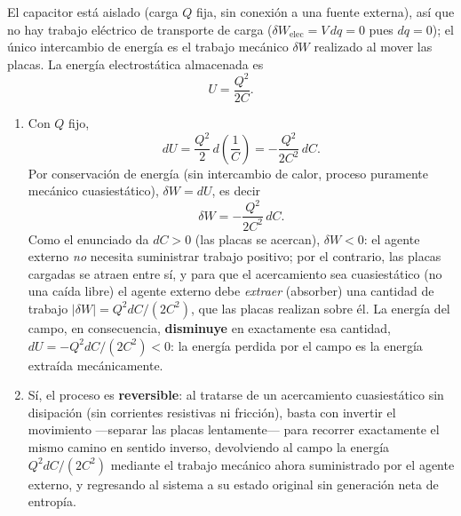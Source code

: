 \documentclass[12pt,a4paper]{article}
\newcommand{\paren}[1]{\left( #1 \right)}
\begin{document}
    \begin{solucion}
        El capacitor está aislado (carga $Q$ fija, sin conexión a una fuente externa), así que
        no hay trabajo eléctrico de transporte de carga ($\delta W_{\text{elec}}=V\,dq=0$ pues
        $dq=0$); el único intercambio de energía es el trabajo mecánico $\delta W$ realizado al
        mover las placas. La energía electrostática almacenada es
        \begin{equation*}
            U=\frac{Q^{2}}{2C}.
        \end{equation*}
        \begin{enumerate}
            \item[a)-b)] Con $Q$ fijo,
            \begin{equation*}
                dU=\frac{Q^{2}}{2}\,d\paren{\frac1C}=-\frac{Q^{2}}{2C^{2}}\,dC.
            \end{equation*}
            Por conservación de energía (sin intercambio de calor, proceso puramente mecánico
            cuasiestático), $\delta W=dU$, es decir
            \begin{equation*}
                \boxed{\delta W=-\frac{Q^{2}}{2C^{2}}\,dC.}
            \end{equation*}
            Como el enunciado da $dC>0$ (las placas se acercan), $\delta W<0$: el agente
            externo \emph{no} necesita suministrar trabajo positivo; por el contrario, las
            placas cargadas se atraen entre sí, y para que el acercamiento sea cuasiestático
            (no una caída libre) el agente externo debe \emph{extraer} (absorber) una cantidad
            de trabajo $|\delta W|=Q^{2}dC/(2C^{2})$, que las placas realizan sobre él. La
            energía del campo, en consecuencia, \textbf{disminuye} en exactamente esa cantidad,
            $dU=-Q^{2}dC/(2C^{2})<0$: la energía perdida por el campo es la energía extraída
            mecánicamente.
            \item[c)] Sí, el proceso es \textbf{reversible}: al tratarse de un acercamiento
            cuasiestático sin disipación (sin corrientes resistivas ni fricción), basta con
            invertir el movimiento —separar las placas lentamente— para recorrer exactamente el
            mismo camino en sentido inverso, devolviendo al campo la energía $Q^{2}dC/(2C^{2})$
            mediante el trabajo mecánico ahora suministrado por el agente externo, y regresando
            al sistema a su estado original sin generación neta de entropía.
        \end{enumerate}
    \end{solucion}
\end{document}
